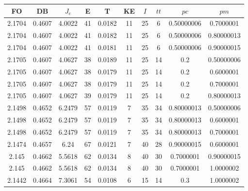 \begin{table}[h!]
    \footnotesize
    \begin{center}
        \begin{tabular}{|c|c|c|c|c|c|c|c|c|c|}
        \hline
            {\bf FO} & {\bf DB} & $J_e$ & {\bf E} & {\bf T} & {\bf KE} & $I$ & $tt$ & $pc$ & $pm$ \\
        \hline
        \hline
            2.1704 & 0.4607  & 4.0022 & 41 & 0.0182 & 11 & 25 & 6 & 0.50000006 & 0.7000001\\
        \hline
        \hline
            2.1704 & 0.4607  & 4.0022 & 41 & 0.0182 & 11 & 25 & 6 & 0.50000006 & 0.80000013\\
        \hline
        \hline
            2.1704 & 0.4607  & 4.0022 & 41 & 0.0181 & 11 & 25 & 6 & 0.50000006 & 0.90000015\\
        \hline
        \hline
            2.1705 & 0.4607  & 4.0627 & 38 & 0.0189 & 11 & 25 & 14 & 0.2 & 0.50000006\\
        \hline
        \hline
            2.1705 & 0.4607  & 4.0627 & 38 & 0.0179 & 11 & 25 & 14 & 0.2 & 0.6000001\\
        \hline
        \hline
            2.1705 & 0.4607  & 4.0627 & 38 & 0.0179 & 11 & 25 & 14 & 0.2 & 0.7000001\\
        \hline
        \hline
            2.1705 & 0.4607  & 4.0627 & 39 & 0.0179 & 11 & 25 & 14 & 0.2 & 0.80000013\\
        \hline
        \hline
            2.1498 & 0.4652  & 6.2479 & 57 & 0.0119 & 7 & 35 & 34 & 0.80000013 & 0.50000006\\
        \hline
        \hline
            2.1498 & 0.4652  & 6.2479 & 57 & 0.0119 & 7 & 35 & 34 & 0.80000013 & 0.6000001\\
        \hline
        \hline
            2.1498 & 0.4652  & 6.2479 & 57 & 0.0119 & 7 & 35 & 34 & 0.80000013 & 0.7000001\\
        \hline
        \hline
            2.1474 & 0.4657  & 6.24 & 67 & 0.0121 & 7 & 40 & 28 & 0.90000015 & 0.6000001\\
        \hline
        \hline
            2.145 & 0.4662  & 5.5618 & 62 & 0.0134 & 8 & 40 & 30 & 0.7000001 & 0.90000015\\
        \hline
        \hline
            2.145 & 0.4662  & 5.5618 & 62 & 0.0134 & 8 & 40 & 30 & 0.7000001 & 1.0000002\\
        \hline
        \hline
            2.1442 & 0.4664  & 7.3061 & 54 & 0.0108 & 6 & 15 & 14 & 0.3 & 1.0000002\\

\end{tabular}
\end{center}
\end{table}

